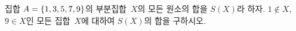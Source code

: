 집합 $A=\{1{,}\mkern3mu\mathopen{}3{,}\mkern3mu\mathopen{}5{,}\mkern3mu\mathopen{}7{,}\mkern3mu\mathopen{}9\}$의 부분집합~$X$의 모든 원소의 합을 $S(X)$라 하자. $1\notin X$, $9\in X$인 모든 집합~$X$에 대하여 $S(X)$의 합을 구하시오.
